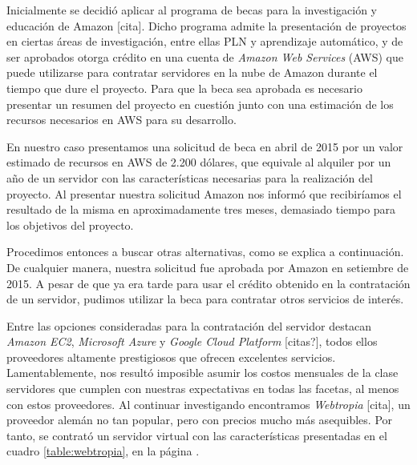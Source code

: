 Inicialmente se decidió aplicar al programa de becas para la investigación y educación de
Amazon [cita]. Dicho programa admite la presentación de proyectos en ciertas áreas de investigación,
entre ellas PLN y aprendizaje automático, y de ser aprobados otorga crédito en una cuenta de
\textit{Amazon Web Services} (AWS) que puede utilizarse para contratar servidores en la nube de Amazon
durante el tiempo que dure el proyecto. Para que la beca sea aprobada es necesario presentar un resumen
del proyecto en cuestión junto con una estimación de los recursos necesarios en AWS para su desarrollo.

En nuestro caso presentamos una solicitud de beca en abril de 2015 por un valor estimado de recursos en
AWS de 2.200 dólares, que equivale al alquiler por un año de un servidor con las características
necesarias para la realización del proyecto. Al presentar nuestra solicitud Amazon nos informó que
recibiríamos el resultado de la misma en aproximadamente tres meses, demasiado tiempo para los objetivos
del proyecto.

Procedimos entonces a buscar otras alternativas, como se explica a continuación. De cualquier manera,
nuestra solicitud fue aprobada por Amazon en setiembre de 2015. A pesar de que ya era tarde para usar el
crédito obtenido en la contratación de un servidor, pudimos utilizar la beca para contratar otros
servicios de interés.

Entre las opciones consideradas para la contratación del servidor destacan \textit{Amazon EC2},
\textit{Microsoft Azure} y \textit{Google Cloud Platform} [citas?], todos ellos proveedores altamente
prestigiosos que ofrecen excelentes servicios. Lamentablemente, nos resultó imposible asumir los costos
mensuales de la clase servidores que cumplen con nuestras expectativas en todas las facetas, al menos
con estos proveedores. Al continuar investigando encontramos \textit{Webtropia} [cita], un proveedor
alemán no tan popular, pero con precios mucho más asequibles. Por tanto, se contrató un servidor virtual
con las características presentadas en el cuadro \ref{table:webtropia}, en la página
\pageref{table:webtropia}.

